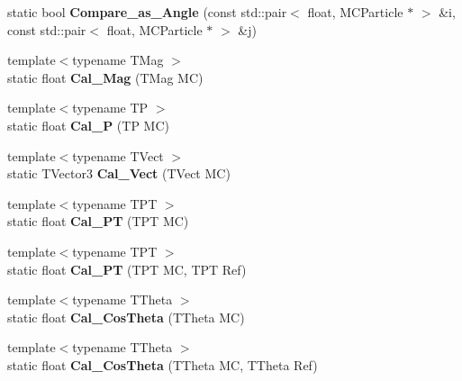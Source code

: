 \begin{DoxyCompactItemize}
\item 
\hypertarget{classToolSet_1_1CMC_abdd82fcdf6cba89df00c9af0b1f77df6}{
static bool {\bfseries Compare\_\-as\_\-Angle} (const std::pair$<$ float, MCParticle $\ast$ $>$ \&i, const std::pair$<$ float, MCParticle $\ast$ $>$ \&j)}
\label{classToolSet_1_1CMC_abdd82fcdf6cba89df00c9af0b1f77df6}

\item 
\hypertarget{classToolSet_1_1CMC_acbada53a8416ca460d7aa07453610dc2}{
{\footnotesize template$<$typename TMag $>$ }\\static float {\bfseries Cal\_\-Mag} (TMag MC)}
\label{classToolSet_1_1CMC_acbada53a8416ca460d7aa07453610dc2}

\item 
\hypertarget{classToolSet_1_1CMC_ae7f67f1180165cedcc4cbeb4e114e5d1}{
{\footnotesize template$<$typename TP $>$ }\\static float {\bfseries Cal\_\-P} (TP MC)}
\label{classToolSet_1_1CMC_ae7f67f1180165cedcc4cbeb4e114e5d1}

\item 
\hypertarget{classToolSet_1_1CMC_a679d9af4f1004560f178ed10f1a3028c}{
{\footnotesize template$<$typename TVect $>$ }\\static TVector3 {\bfseries Cal\_\-Vect} (TVect MC)}
\label{classToolSet_1_1CMC_a679d9af4f1004560f178ed10f1a3028c}

\item 
\hypertarget{classToolSet_1_1CMC_ac479ce63e1328c284ef104449b30d465}{
{\footnotesize template$<$typename TPT $>$ }\\static float {\bfseries Cal\_\-PT} (TPT MC)}
\label{classToolSet_1_1CMC_ac479ce63e1328c284ef104449b30d465}

\item 
\hypertarget{classToolSet_1_1CMC_a8c4c04395c95a6c513f049029c157a7d}{
{\footnotesize template$<$typename TPT $>$ }\\static float {\bfseries Cal\_\-PT} (TPT MC, TPT Ref)}
\label{classToolSet_1_1CMC_a8c4c04395c95a6c513f049029c157a7d}

\item 
\hypertarget{classToolSet_1_1CMC_a7142700aa3c1b586b976e9d71301c7bc}{
{\footnotesize template$<$typename TTheta $>$ }\\static float {\bfseries Cal\_\-CosTheta} (TTheta MC)}
\label{classToolSet_1_1CMC_a7142700aa3c1b586b976e9d71301c7bc}

\item 
\hypertarget{classToolSet_1_1CMC_a91c74f61d1c9656e68f4b1037976a51b}{
{\footnotesize template$<$typename TTheta $>$ }\\static float {\bfseries Cal\_\-CosTheta} (TTheta MC, TTheta Ref)}
\label{classToolSet_1_1CMC_a91c74f61d1c9656e68f4b1037976a51b}


\end{DoxyCompactItemize}
